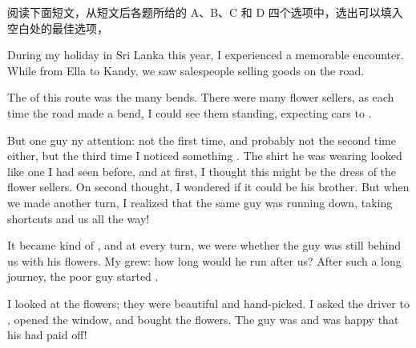 \documentclass{英语试卷}
\begin{document}
\par 阅读下面短文，从短文后各题所给的 A、B、C 和 D 四个选项中，选出可以填入空白处的最佳选项，\par
\par During my holiday in Sri Lanka this year, I experienced a memorable encounter. While  from Ella to Kandy, we saw salespeople selling goods on the road.\par
\par The  of this route was the many bends. There were many flower sellers, as each time the road made a bend, I could see them standing, expecting cars to .\par
\par But one guy  ny attention: not the first time, and probably not the second time either, but the third time I noticed something . The shirt he was wearing looked like one I had seen before, and at first, I thought this might be the  dress of the flower sellers. On second thought, I wondered if it could be his  brother. But when we made another turn, I realized that the same guy was running down, taking shortcuts and  us all the way!\par
\par It became kind of , and at every turn, we were  whether the guy was still behind us with his flowers. My  grew: how long would he run after us? After such a long journey, the poor guy started .\par
\par I looked at the flowers; they were beautiful and hand-picked. I asked the driver to , opened the window, and bought the flowers. The guy was  and was happy that his  had paid off!\par
{}
\end{document}

